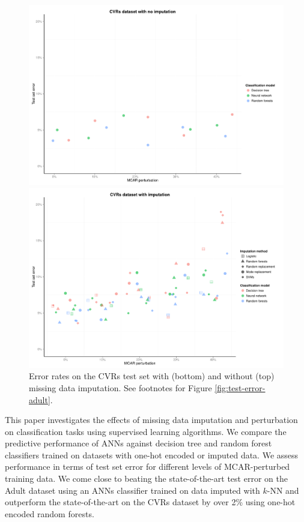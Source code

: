 \documentclass[10pt]{book}
\theoremstyle{definition}
\begin{document}
\begin{figure}[h!]
\includegraphics[scale=0.6, center]{figure/test-errors-votes-no-imp-mcar}\par
\includegraphics[scale=0.6, center]{figure/test-errors-votes-imp-mcar}\par
   \caption{\footnotesize Error rates on the CVRs test set with (bottom) and without (top) missing data imputation. See footnotes for Figure \ref{fig:test-error-adult}.}
   \label{fig:test-error-votes}
\end{figure}

\par

\setcounter{chapter}{4}
\setcounter{equation}{0} %

This paper investigates the effects of missing data imputation and perturbation on classification tasks using supervised learning algorithms. We compare the predictive performance of ANNs against decision tree and random forest classifiers trained on datasets with one-hot encoded or imputed data. We assess performance in terms of test set error for different levels of MCAR-perturbed training data. We come close to beating the state-of-the-art test error on the Adult dataset using an ANNs classifier trained on data imputed with $k$-NN and outperform the state-of-the-art on the CVRs dataset by over 2\% using one-hot encoded random forests. 
\end{document}

